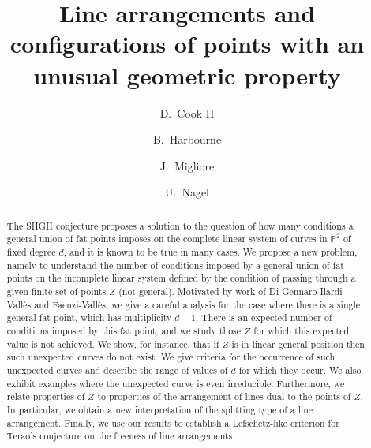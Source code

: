 \documentclass[12pt]{amsart}
\numberwithin{equation}{section}
\theoremstyle{definition}
\begin{document}
\title[Line arrangements]{Line arrangements and configurations of points with an unusual geometric property}

\author{D.\ Cook II}
\address{Department of Mathematics and Computer Science\\
Eastern Illinois University\\
600 Lincoln Avenue\\
Charleston, IL 61920-3099 USA}

\author{B.\ Harbourne}
\address{Department of Mathematics\\
University of Nebraska\\
Lincoln, NE 68588-0130 USA}

\author{J.\ Migliore} 
\address{Department of Mathematics \\
University of Notre Dame \\
Notre Dame, IN 46556 USA}

\author{U.\ Nagel}
\address{Department of Mathematics\\
University of Kentucky\\
715 Patterson Office Tower\\
Lexington, KY 40506-0027 USA}

\begin{abstract} 
    The SHGH conjecture proposes a solution to the question of how many conditions a general union of fat points imposes on
    the complete linear system of curves in $\mathbb P^2$ of fixed degree $d$, and it is known to be true in many cases. We
    propose a new problem, namely to understand the number of conditions imposed by a general union of fat points on the
    incomplete linear system defined by the condition of passing through a given finite set of points $Z$ (not general). Motivated
    by work of Di Gennaro-Ilardi-Vall\`es and Faenzi-Vall\`es, we give a careful analysis for the case where there
    is a single general fat point, which has multiplicity $d-1$. There is an expected number of conditions imposed by this fat point, and we
    study those $Z$ for which this expected value is not achieved. We show, for instance, that if $Z$ is in linear general position
    then such unexpected curves do not exist.  We give criteria for the occurrence of such unexpected curves and describe the range
    of values of $d$ for which they occur. We also exhibit examples where the unexpected curve is even irreducible. Furthermore, we relate properties
    of $Z$ to properties of the arrangement  of lines dual to the points of $Z$. In particular, we obtain a new interpretation of
    the splitting type of a line arrangement. Finally, we use our results to establish a Lefschetz-like criterion for Terao's
    conjecture on the freeness of line arrangements.
\end{abstract}
\end{document}
